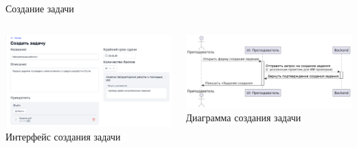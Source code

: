 \documentclass[aspectratio=169]{beamer}
\begin{document}
%

\begin{frame}{Создание задачи}
\vspace{0.5em}

\begin{columns}
    \begin{column}{0.5\textwidth}
        \centering
        \includegraphics[width=\linewidth]{static/TaskCreate.png} \\
        \small Интерфейс создания задачи
    \end{column}
    \begin{column}{0.5\textwidth}
        \centering
        \includegraphics[width=\linewidth]{static/TaskCreateDiagram.png} \\
        \small Диаграмма создания задачи
    \end{column}
\end{columns}
\end{frame}
\end{document}
